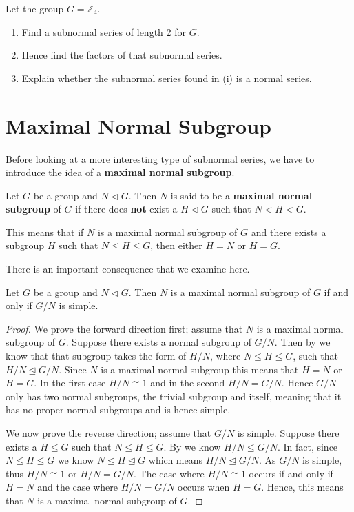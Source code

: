 \begin{exercise}
    Let the group $G = \mathbb{Z}_4$.
    \begin{enumerate}[label=(\roman*)]
        \item Find a subnormal series of length 2 for $G$.
        \item Hence find the factors of that subnormal series.
        \item Explain whether the subnormal series found in (i) is a normal series.
    \end{enumerate}
\end{exercise}

\section{Maximal Normal Subgroup}
Before looking at a more interesting type of subnormal series, we have to introduce the idea of a \textbf{maximal normal subgroup}.
\begin{definition}
    Let $G$ be a group and $N \lhd G$. Then $N$ is said to be a \textbf{maximal normal subgroup} of $G$ if there does \textbf{not} exist a $H \lhd G$ such that $N < H < G$.
\end{definition}
\begin{remark}
    This means that if $N$ is a maximal normal subgroup of $G$ and there exists a subgroup $H$ such that $N \leq H \leq G$, then either $H = N$ or $H = G$.
\end{remark}

There is an important consequence that we examine here.
\begin{theorem}\label{thrm-maximal-normal-subgroup-iff-quotient-is-simple}
    Let $G$ be a group and $N \lhd G$. Then $N$ is a maximal normal subgroup of $G$ if and only if $G/N$ is simple.
\end{theorem}

\begin{proof}
    We prove the forward direction first; assume that $N$ is a maximal normal subgroup of $G$. Suppose there exists a normal subgroup of $G/N$. Then by  we know that that subgroup takes the form of $H/N$, where $N \leq H \leq G$, such that $H/N \unlhd G/N$. Since $N$ is a maximal normal subgroup this means that $H = N$ or $H = G$. In the first case $H/N \cong 1$ and in the second $H / N = G/N$. Hence $G/N$ only has two normal subgroups, the trivial subgroup and itself, meaning that it has no proper normal subgroups and is hence simple.
    
    We now prove the reverse direction; assume that $G/N$ is simple. Suppose there exists a $H \leq G$ such that $N \leq H \leq G$. By  we know $H/N \leq G/N$. In fact, since $N \leq H \leq G$ we know $N \unlhd H \unlhd G$ which means $H/N \unlhd G/N$. As $G/N$ is simple, thus $H/N \cong 1$ or $H/N = G/N$. The case where $H/N \cong 1$ occurs if and only if $H = N$ and the case where $H/N = G/N$ occurs when $H = G$. Hence, this means that $N$ is a maximal normal subgroup of $G$.
\end{proof}

